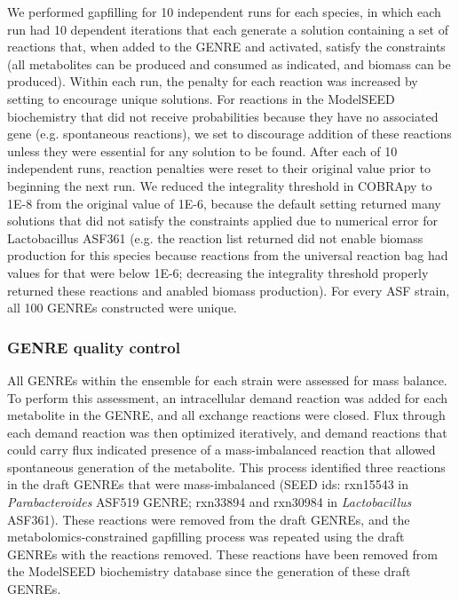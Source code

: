 \documentclass[11pt,onecolumn,notitlepage,openany,twoside]{book}
\begin{document}
\begin{refsection}
We performed gapfilling for 10 independent runs for each species, in which each run had 10 dependent iterations that each generate a solution containing a set of reactions that, when added to the GENRE and activated, satisfy the constraints (all metabolites can be produced and consumed as indicated, and biomass can be produced). Within each run, the penalty for each reaction was increased by setting  to encourage unique solutions. For reactions in the ModelSEED biochemistry that did not receive probabilities because they have no associated gene (e.g. spontaneous reactions), we set  to discourage addition of these reactions unless they were essential for any solution to be found. After each of 10 independent runs, reaction penalties were reset to their original value prior to beginning the next run. We reduced the integrality threshold in COBRApy to 1E-8 from the original value of 1E-6, because the default setting returned many solutions that did not satisfy the constraints applied due to numerical error for Lactobacillus ASF361 (e.g. the reaction list returned did not enable biomass production for this species because reactions from the universal reaction bag had values for  that were below 1E-6; decreasing the integrality threshold properly returned these reactions and anabled biomass production). For every ASF strain, all 100 GENREs constructed were unique.

\subsubsection{GENRE quality control}

All GENREs within the ensemble for each strain were assessed for mass balance. To perform this assessment, an intracellular demand reaction was added for each metabolite in the GENRE, and all exchange reactions were closed. Flux through each demand reaction was then optimized iteratively, and demand reactions that could carry flux indicated presence of a mass-imbalanced reaction that allowed spontaneous generation of the metabolite. This process identified three reactions in the draft GENREs that were mass-imbalanced (SEED ids: rxn15543 in \textit{Parabacteroides} ASF519 GENRE; rxn33894 and rxn30984 in \textit{Lactobacillus} ASF361). These reactions were removed from the draft GENREs, and the metabolomics-constrained gapfilling process was repeated using the draft GENREs with the reactions removed. These reactions have been removed from the ModelSEED biochemistry database since the generation of these draft GENREs.


\end{refsection}
\end{document}
